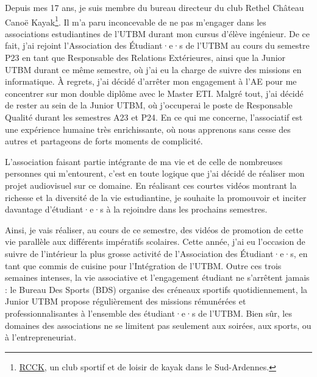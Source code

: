 
Depuis mes 17 ans, je suis membre du bureau directeur du club Rethel Château Canoë Kayak\footnote{\href{https://rcck-ardennes.fr}{RCCK}, un club sportif et de loisir de kayak dans le Sud-Ardennes.}.
Il m'a paru inconcevable de ne pas m'engager dans les associations estudiantines de l'\gls{UTBM} durant mon cursus d'élève ingénieur.
De ce fait, j'ai rejoint l'Association des Étudiant·e·s de l'\gls{UTBM} au cours du semestre P23 en tant que Responsable des Relations Extérieures, ainsi que la Junior \gls{UTBM} durant ce même semestre, où j'ai eu la charge de suivre des missions en informatique.
À regrets, j'ai décidé d'arrêter mon engagement à l'\gls{AE} pour me concentrer sur mon double diplôme avec le Master ETI. Malgré tout, j'ai décidé de rester au sein de la Junior \gls{UTBM}, où j'occuperai le poste de Responsable Qualité durant les semestres A23 et P24.
En ce qui me concerne, l'associatif est une expérience humaine très enrichissante, où nous apprenons sans cesse des autres et partageons de forts moments de complicité.

L'association faisant partie intégrante de ma vie et de celle de nombreuses personnes qui m'entourent, c'est en toute logique que j'ai décidé de réaliser mon projet audiovisuel sur ce domaine.
En réalisant ces courtes vidéos montrant la richesse et la diversité de la vie estudiantine, je souhaite la promouvoir et inciter davantage d'étudiant·e·s à la rejoindre dans les prochains semestres.

Ainsi, je vais réaliser, au cours de ce semestre, des vidéos de promotion de cette vie parallèle aux différents impératifs scolaires.
Cette année, j'ai eu l'occasion de suivre de l'intérieur la plus grosse activité de l'Association des Étudiant·e·s, en tant que commis de cuisine pour l'Intégration de l'\gls{UTBM}.
Outre ces trois semaines intenses, la vie associative et l'engagement étudiant ne s'arrêtent jamais : le Bureau Des Sports (BDS) organise des créneaux sportifs quotidiennement, la Junior \gls{UTBM} propose régulièrement des missions rémunérées et professionnalisantes à l'ensemble des étudiant·e·s de l'\gls{UTBM}.
Bien sûr, les domaines des associations ne se limitent pas seulement aux soirées, aux sports, ou à l'entrepreneuriat.
